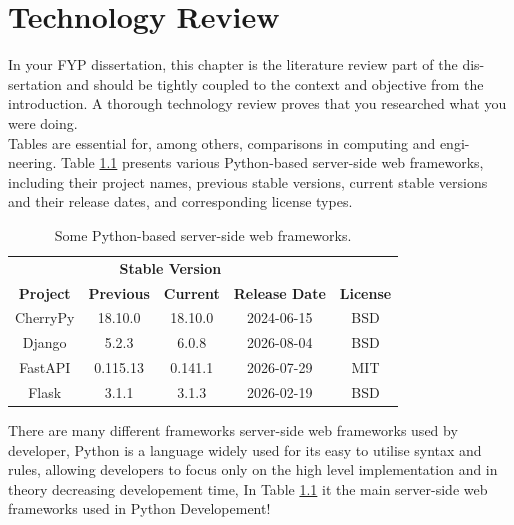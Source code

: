 \chapter{Technology Review} \label{cha:techreview}
In your FYP dissertation, this chapter is the literature review part of the dis-
sertation and should be tightly coupled to the context and objective from the
introduction. A thorough technology review proves that you researched what
you were doing. \\
Tables are essential for, among others, comparisons in computing and engi-
neering. Table \ref{tab:pythonframeworks} presents various Python-based server-side web frameworks,
including their project names, previous stable versions, current stable versions
and their release dates, and corresponding license types.
\begin{table} [!ht]
    \centering
    \begin{tabular}{ccccc}
    \hline
    \multicolumn{4}{c}{\textbf{Stable Version}}\\
    \textbf{Project} & \textbf{Previous} & \textbf{Current} & \textbf{Release Date} & \textbf{License} \\
    \hline
    CherryPy & 18.10.0 & 18.10.0 & 2024-06-15 & BSD\\
    Django & 5.2.3 & 6.0.8 & 2026-08-04 & BSD \\
    FastAPI & 0.115.13 & 0.141.1 & 2026-07-29 & MIT \\
    Flask & 3.1.1 & 3.1.3 & 2026-02-19 & BSD \\
    \hline
    \end{tabular}
    \caption{Some Python-based server-side web frameworks.}
    \label{tab:pythonframeworks}
\end{table}

There are many different frameworks server-side web frameworks used by developer,
Python is a language widely used for its easy to utilise syntax and rules, allowing developers to
focus only on the high level implementation and in theory decreasing developement time,
In Table
\ref{tab:pythonframeworks}
it the main server-side web frameworks used in Python Developement!
